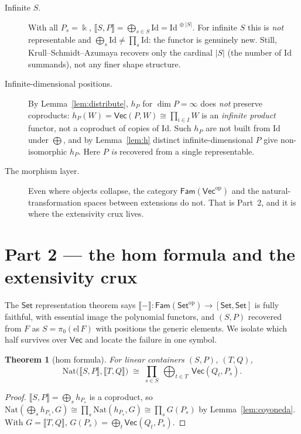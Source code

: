\documentclass[11pt]{amsart}
\theoremstyle{plain}
\newtheorem{theorem}{Theorem}[section]
\theoremstyle{definition}
\renewcommand{\Vec}{\mathsf{Vec}}
\newcommand{\Set}{\mathsf{Set}}
\newcommand{\Fam}{\mathsf{Fam}}
\newcommand{\op}{\mathrm{op}}
\newcommand{\Nat}{\mathrm{Nat}}
\newcommand{\Id}{\mathrm{Id}}
\newcommand{\ext}[1]{\llbracket #1 \rrbracket}
\newcommand{\fld}{\Bbbk}
\newcommand{\bul}{{-}}
\newcommand{\iso}{\cong}
\begin{document}
\begin{description}
\item[Infinite $S$.] With all $P_s=\fld$, $\ext{S,P}=\bigoplus_{s\in S}\Id=
  \Id^{\,\oplus|S|}$. For infinite $S$ this is \emph{not} representable and
  $\bigoplus_s\Id\neq\prod_s\Id$: the functor is genuinely new. Still,
  Krull--Schmidt--Azumaya recovers only the cardinal $|S|$ (the number of $\Id$
  summands), not any finer shape structure.
\item[Infinite-dimensional positions.] By Lemma~\ref{lem:distribute}, $h_P$ for
  $\dim P=\infty$ does \emph{not} preserve coproducts:
  $h_P(W)=\Vec(P,W)\iso\prod_{i\in I}W$ is an \emph{infinite product} functor,
  not a coproduct of copies of $\Id$. Such $h_P$ are not built from $\Id$ under
  $\bigoplus$, and by Lemma~\ref{lem:h} distinct infinite-dimensional $P$ give
  non-isomorphic $h_P$. Here $P$ \emph{is} recovered from a single
  representable.
\item[The morphism layer.] Even where objects collapse, the category
  $\Fam(\Vec^\op)$ and the natural-transformation spaces between extensions do
  not. That is Part~2, and it is where the extensivity crux lives.
\end{description}

\section{Part 2 --- the hom formula and the extensivity crux}\label{sec:crux}

The $\Set$ representation theorem says $\ext{\bul}\colon\Fam(\Set^\op)\to
[\Set,\Set]$ is fully faithful, with essential image the polynomial functors,
and $(S,P)$ recovered from $F$ as $S=\pi_0(\mathrm{el}\,F)$ with positions the
generic elements. We isolate which half survives over $\Vec$ and locate the
failure in one symbol.

\begin{theorem}[hom formula]\label{thm:hom}
For linear containers $(S,P)$, $(T,Q)$,
\[
  \Nat\bigl(\ext{S,P},\ext{T,Q}\bigr)\;\iso\;
  \prod_{s\in S}\ \bigoplus_{t\in T}\ \Vec(Q_t,P_s).
\]
\end{theorem}

\begin{proof}
$\ext{S,P}=\bigoplus_s h_{P_s}$ is a coproduct, so
$\Nat(\bigoplus_s h_{P_s},G)\iso\prod_s\Nat(h_{P_s},G)\iso\prod_s G(P_s)$ by
Lemma~\ref{lem:coyoneda}. With $G=\ext{T,Q}$, $G(P_s)=\bigoplus_t\Vec(Q_t,P_s)$.
\end{proof}
\end{document}
